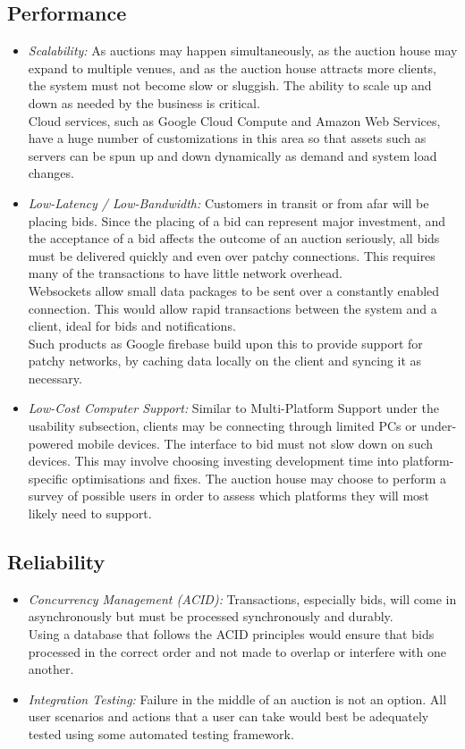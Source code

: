 \documentclass[titlepage, 12pt]{extarticle}
\begin{document}
\subsection{Performance}
\begin{itemize}
\item {\it Scalability:} As auctions may happen simultaneously, as the auction house may expand to multiple venues, and as the auction house attracts more clients, the system must not become slow or sluggish. The ability to scale up and down as needed by the business is critical.
\\ Cloud services, such as Google Cloud Compute and Amazon Web Services, have a huge number of customizations in this area so that assets such as servers can be spun up and down dynamically as demand and system load changes.
\item {\it Low-Latency / Low-Bandwidth:} Customers in transit or from afar will be placing bids. Since the placing of a bid can represent major investment, and the acceptance of a bid affects the outcome of an auction seriously, all bids must be delivered quickly and even over patchy connections. This requires many of the transactions to have little network overhead.
\\Websockets allow small data packages to be sent over a constantly enabled connection. This would allow rapid transactions between the system and a client, ideal for bids and notifications. 
\\Such products as Google firebase build upon this to provide support for patchy networks, by caching data locally on the client and syncing it as necessary.
\item {\it Low-Cost Computer Support:} Similar to Multi-Platform Support under the usability subsection, clients may be connecting through limited PCs or under-powered mobile devices. The interface to bid must not slow down on such devices. This may involve choosing investing development time into platform-specific optimisations and fixes. The auction house may choose to perform a survey of possible users in order to assess which platforms they will most likely need to support.
\end{itemize}
\subsection{Reliability}
\begin{itemize}
\item {\it Concurrency Management (ACID):} Transactions, especially bids, will come in asynchronously but must be processed synchronously and durably. 
\\Using a database that follows the ACID principles would ensure that bids processed in the correct order and not made to overlap or interfere with one another.
\item {\it Integration Testing:} Failure in the middle of an auction is not an option. All user scenarios and actions that a user can take would best be adequately tested using some automated testing framework.
\end{itemize}
\end{document}
